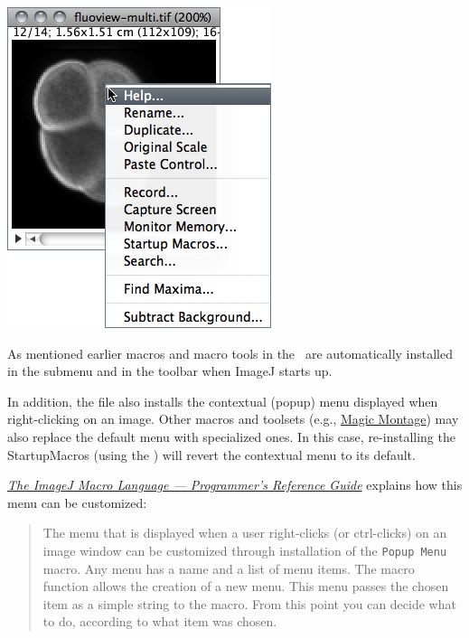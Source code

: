 \begin{minipage}[c][1\totalheight][t]{0.413\columnwidth}%
\includegraphics[scale=0.55]{images/PopupMenu}%
\end{minipage}%
\begin{minipage}[c][1\totalheight][t]{0.587\columnwidth}%
As mentioned earlier macros and macro tools in the\texttt{ }
are automatically installed in the \textsf{
}submenu and in the toolbar when ImageJ starts up. 

\medskip{}
In addition, the  file also installs
the contextual (popup)
menu displayed when right-clicking on an image. Other macros and toolsets
(e.g., \href{http://imagejdocu.tudor.lu/doku.php?id=howto:working:work_with_magic_montage}{Magic Montage})
may also replace the default menu with specialized ones. In this case,
re-installing the StartupMacros (using the )
will revert the contextual menu to its default.\medskip{}


\emph{\href{http://imagej.nih.gov/ij/docs/macro_reference_guide.pdf}{The ImageJ Macro Language --- Programmer's Reference Guide}}
explains how this menu can be customized: %
\end{minipage}
\begin{quotation}
The menu that is displayed when a user right-clicks (or ctrl-clicks)
on an image window can be customized through installation of the \texttt{\textquotedbl{}Popup
Menu\textquotedbl{}} macro. Any menu has a name and a list of menu
items. The \texttt{} macro function
allows the creation of a new menu. This menu passes the chosen item
as a simple string to the \texttt{}
macro. From this point you can decide what to do, according to what
item was chosen.
\end{quotation}

